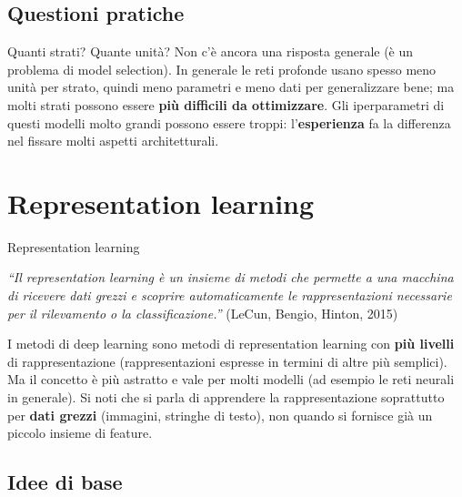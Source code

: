 \subsection{Questioni pratiche}\label{questioni-pratiche}

Quanti strati? Quante unità? Non c'è ancora una risposta generale (è un
problema di model selection). In generale le reti profonde usano spesso
meno unità per strato, quindi meno parametri e meno dati per
generalizzare bene; ma molti strati possono essere \textbf{più difficili
da ottimizzare}. Gli iperparametri di questi modelli molto grandi
possono essere troppi: l'\textbf{esperienza} fa la differenza nel
fissare molti aspetti architetturali.

\section{Representation learning}\label{representation-learning}

\begin{boxdefinition}{Representation learning}

\emph{``Il representation learning è un insieme di metodi che permette a
una macchina di ricevere dati grezzi e scoprire automaticamente le
rappresentazioni necessarie per il rilevamento o la classificazione.''}
(LeCun, Bengio, Hinton, 2015)

\end{boxdefinition}

I metodi di deep learning sono metodi di representation learning con
\textbf{più livelli} di rappresentazione (rappresentazioni espresse in
termini di altre più semplici). Ma il concetto è più astratto e vale per
molti modelli (ad esempio le reti neurali in generale). Si noti che si
parla di apprendere la rappresentazione soprattutto per \textbf{dati
grezzi} (immagini, stringhe di testo), non quando si fornisce già un
piccolo insieme di feature.

\subsection{Idee di base}\label{idee-di-base}

